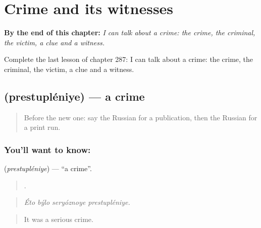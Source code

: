 
\chapter{Crime and its witnesses}
\label{ch:ru-crime-and-its-witnesses}

\begin{chapteropening}
\textbf{By the end of this chapter:} \emph{I can talk about a crime: the crime, the criminal, the victim, a clue and a witness.}

Complete the last lesson of chapter 287: I can talk about a crime: the crime, the criminal, the victim, a clue and a witness.
\end{chapteropening}

\section[\texorpdfstring{\ru{преступление} (prestupléniye)}{преступление (prestupléniye)}]{ (prestupléniye) — a crime}

\label{lesson:RU-C287-prestupleniye}



\begin{quote}
Before the new one: say the Russian for a publication, then the Russian for a print run.
\end{quote}

\subsection*{You'll want to know: }
\textbf{} (\emph{prestupléniye}) — \textquotedblleft{}a crime\textquotedblright{}.

\begin{quote}
   .
\end{quote}

\begin{quote}
\emph{Éto býlo seryóznoye prestupléniye.}
\end{quote}

\begin{quote}
It was a serious crime.
\end{quote}

